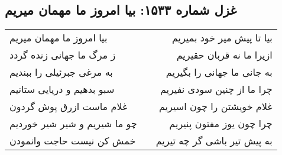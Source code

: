 \begin{center}
\section*{غزل شماره ۱۵۳۳: بیا امروز ما مهمان میریم}
\label{sec:1533}
\begin{longtable}{l p{0.5cm} r}
بیا امروز ما مهمان میریم
&&
بیا تا پیش میر خود بمیریم
\\
ز مرگ ما جهانی زنده گردد
&&
ازیرا ما نه قربان حقیریم
\\
به مرغی جبرئیلی را ببندیم
&&
به جانی ما جهانی را بگیریم
\\
سبو بدهیم و دریایی ستانیم
&&
چرا ما از چنین سودی نفیریم
\\
غلام ماست ازرق پوش گردون
&&
غلام خویشتن را چون اسیریم
\\
چو ما شیریم و شیر شیر خوردیم
&&
چرا چون یوز مفتون پنیریم
\\
خمش کن نیست حاجت وانمودن
&&
به پیش تیر باشی گر چه تیریم
\\
\end{longtable}
\end{center}
